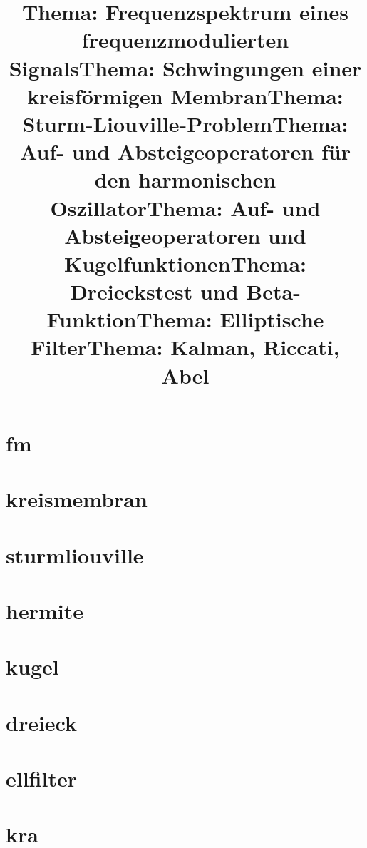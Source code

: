 \title[fm]{Thema: Frequenzspektrum eines frequenzmodulierten Signals}
\section{fm}
\titel


\title[kreismembran]{Thema: Schwingungen einer kreisförmigen Membran}
\section{kreismembran}
\titel


\title[sturmliouville]{Thema: Sturm-Liouville-Problem}
\section{sturmliouville}
\titel


\title[hermite]{Thema: Auf- und Absteigeoperatoren für den harmonischen Oszillator}
\section{hermite}
\titel


\title[kugel]{Thema: Auf- und Absteigeoperatoren und Kugelfunktionen}
\section{kugel}
\titel


\title[dreieck]{Thema: Dreieckstest und Beta-Funktion}
\section{dreieck}
\titel


\title[ellfilter]{Thema: Elliptische Filter}
\section{ellfilter}
\titel


\title[kra]{Thema: Kalman, Riccati, Abel}
\section{kra}
\titel


